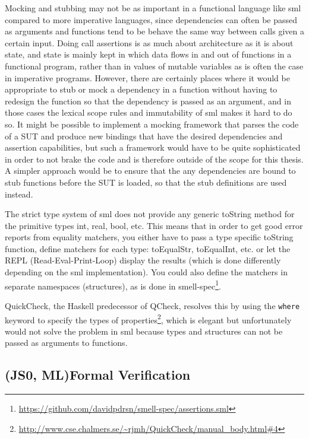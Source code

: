 \documentclass[11pt]{article}
\begin{document}
Mocking and stubbing may not be as important in a functional language like \gls{sml} compared to more imperative languages, since dependencies can often be passed as arguments and functions tend to be behave the same way between calls given a certain input. Doing call assertions is as much about architecture as it is about state, and state is mainly kept in which data flows in and out of functions in a functional program, rather than in values of mutable variables as is often the case in imperative programs. However, there are certainly places where it would be appropriate to stub or mock a dependency in a function without having to redesign the function so that the dependency is passed as an argument, and in those cases the lexical scope rules and immutability of \gls{sml} makes it hard to do so. It might be possible to implement a mocking framework that parses the code of a SUT and produce new bindings that have the desired dependencies and assertion capabilities, but such a framework would have to be quite sophisticated in order to not brake the code and is therefore outside of the scope for this thesis. A simpler approach would be to ensure that the any dependencies are bound to stub functions before the SUT is loaded, so that the stub definitions are used instead. %

The strict type system of \gls{sml} does not provide any generic toString method for the primitive types int, real, bool, etc. This means that in order to get good error reports from equality \glspl{matcher}, you either have to pass a type specific toString function, define \glspl{matcher} for each type: toEqualStr, toEqualInt, etc. or let the REPL (Read-Eval-Print-Loop) display the results (which is done differently depending on the \gls{sml} implementation). You could also define the \glspl{matcher} in separate namespaces (structures), as is done in smell-spec\footnote{\url{https://github.com/davidpdrsn/smell-spec/assertions.sml}}.

QuickCheck, the Haskell predecessor of QCheck, resolves this by using the \texttt{where} keyword to specify the types of properties\footnote{\url{http://www.cse.chalmers.se/~rjmh/QuickCheck/manual\_body.html\#4}}, which is elegant but unfortunately would not solve the problem in \gls{sml} because types and structures can not be passed as arguments to functions. %

\subsection{(JS0, ML)Formal Verification}
\end{document}
